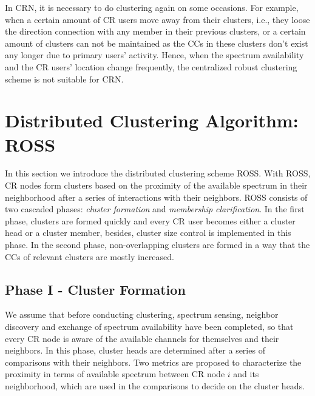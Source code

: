 \documentclass[10pt,journal,compsoc]{IEEEtran}
\theoremstyle{mytheoremstyle}
\theoremstyle{mytheoremstyle}
\theoremstyle{mytheoremstyle}
\newcommand{\ie}{i.e., }
\newcommand{\bigO}{\ensuremath{\mathcal{O}}}%
\begin{document}
In CRN, it is necessary to do clustering again on some occasions.
For example, when a certain amount of CR users move away from their clusters, \ie they loose the direction connection with any member in their previous clusters, or a certain amount of clusters can not be maintained as the CCs in these clusters don't exist any longer due to primary users' activity. 
Hence, when the spectrum availability and the CR users' location change frequently, the centralized robust clustering scheme is not suitable for CRN.


\section{Distributed Clustering Algorithm: ROSS}
\label{ross}

In this section we introduce the distributed clustering scheme ROSS.
With ROSS, CR nodes form clusters based on the proximity of the available spectrum in their neighborhood after a series of interactions with their neighbors.
ROSS consists of two cascaded phases: \textit{cluster formation} and \textit{membership clarification}.
In the first phase, clusters are formed quickly and every CR user becomes either a cluster head or a cluster member, besides, cluster size control is implemented in this phase.
In the second phase, non-overlapping clusters are formed in a way that the CCs of relevant clusters are mostly increased.

	

\subsection{Phase I - Cluster Formation}
\label{phaseI}
We assume that before conducting clustering, spectrum sensing, neighbor discovery and exchange of spectrum availability have been completed, so that every CR node is aware of the available channels for themselves and their neighbors.
In this phase, cluster heads are determined after a series of comparisons with their neighbors. 
Two metrics are proposed to characterize the proximity in terms of available spectrum between CR node $i$ and its neighborhood, which are used in the comparisons to decide on the cluster heads.
\end{document}
